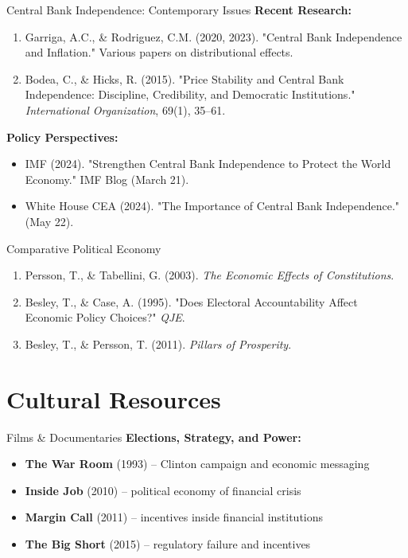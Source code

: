 \documentclass[10pt]{beamer}
\begin{document}
\begin{frame}{Central Bank Independence: Contemporary Issues}
\footnotesize
\textbf{Recent Research:}
\begin{enumerate}
\item Garriga, A.C., \& Rodriguez, C.M. (2020, 2023). "Central Bank Independence and Inflation." Various papers on distributional effects.
\item Bodea, C., \& Hicks, R. (2015). "Price Stability and Central Bank Independence: Discipline, Credibility, and Democratic Institutions." \emph{International Organization}, 69(1), 35–61.
\end{enumerate}

\vspace{0.2cm}
\textbf{Policy Perspectives:}
\begin{itemize}
\item IMF (2024). "Strengthen Central Bank Independence to Protect the World Economy." IMF Blog (March 21).
\item White House CEA (2024). "The Importance of Central Bank Independence." (May 22).
\end{itemize}
\end{frame}
\begin{frame}{Comparative Political Economy}
\footnotesize
\begin{enumerate}
\item Persson, T., \& Tabellini, G. (2003). \emph{The Economic Effects of Constitutions}.
\item Besley, T., \& Case, A. (1995). "Does Electoral Accountability Affect Economic Policy Choices?" \emph{QJE}.
\item Besley, T., \& Persson, T. (2011). \emph{Pillars of Prosperity}.
\end{enumerate}
\end{frame}



\section*{Cultural Resources}

\begin{frame}{Films \& Documentaries}
\textbf{Elections, Strategy, and Power:}
\begin{itemize}
\item \textbf{The War Room} (1993) – Clinton campaign and economic messaging
\item \textbf{Inside Job} (2010) – political economy of financial crisis
\item \textbf{Margin Call} (2011) – incentives inside financial institutions
\item \textbf{The Big Short} (2015) – regulatory failure and incentives
\end{itemize}
\end{frame}
\end{document}

